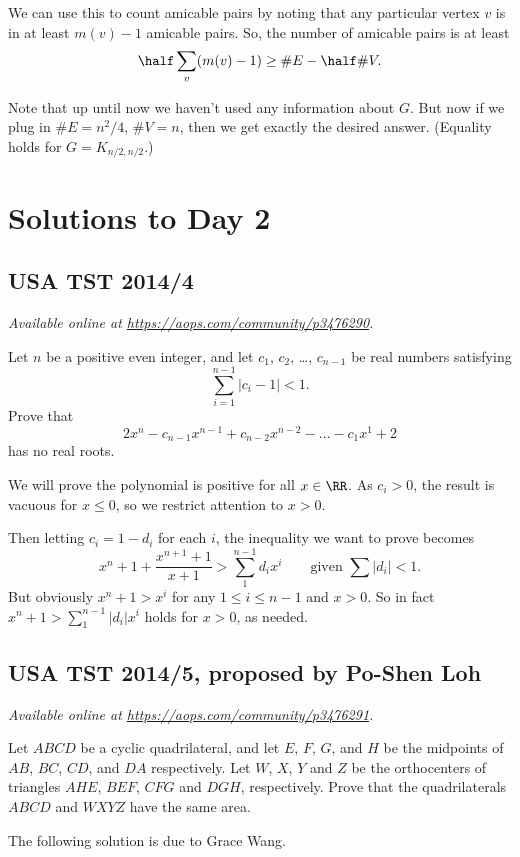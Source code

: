 \documentclass[11pt]{scrartcl}
\begin{document}
We can use this to count amicable pairs
by noting that any particular vertex $v$ is in
at least $m(v)-1$ amicable pairs.
So, the number of amicable pairs is at least
\[ \half \sum_v (m(v)-1) \ge \# E - \half \# V. \]

Note that up until now we haven't used any information about $G$.
But now if we plug in $\# E = n^2/4$, $\# V = n$,
then we get exactly the desired answer.
(Equality holds for $G = K_{n/2, n/2}$.)
\pagebreak

\section{Solutions to Day 2}
\subsection{USA TST 2014/4}
\textsl{Available online at \url{https://aops.com/community/p3476290}.}
\begin{mdframed}[style=mdpurplebox,frametitle={Problem statement}]
Let $n$ be a positive even integer,
and let $c_1$, $c_2$, \dots, $c_{n-1}$ be real numbers satisfying
\[ \sum_{i=1}^{n-1} \left\lvert c_i-1 \right\rvert < 1. \]
Prove that
\[ 2x^n - c_{n-1}x^{n-1} + c_{n-2}x^{n-2} - \dots - c_1x^1 + 2 \]
has no real roots.
\end{mdframed}
We will prove the polynomial is positive for all $x \in \RR$.
As $c_i > 0$, the result is vacuous for $x \le 0$,
so we restrict attention to $x > 0$.

Then letting $c_i = 1 - d_i$ for each $i$,
the inequality we want to prove becomes
\[ x^n + 1 + \frac{x^{n+1}+1}{x+1} > \sum_1^{n-1} d_i x^i
  \qquad\text{given } \sum |d_i| < 1.  \]
But obviously $x^n+1 > x^i$ for any $1 \le i \le n-1$ and $x > 0$.
So in fact $x^n+1 > \sum_1^{n-1} |d_i| x^i$ holds for $x > 0$,
as needed.
\pagebreak

\subsection{USA TST 2014/5, proposed by Po-Shen Loh}
\textsl{Available online at \url{https://aops.com/community/p3476291}.}
\begin{mdframed}[style=mdpurplebox,frametitle={Problem statement}]
Let $ABCD$ be a cyclic quadrilateral,
and let $E$, $F$, $G$, and $H$ be the midpoints of $AB$, $BC$, $CD$, and $DA$ respectively.
Let $W$, $X$, $Y$ and $Z$ be the orthocenters of
triangles $AHE$, $BEF$, $CFG$ and $DGH$, respectively.
Prove that the quadrilaterals $ABCD$ and $WXYZ$ have the same area.
\end{mdframed}
The following solution is due to Grace Wang.
\end{document}
